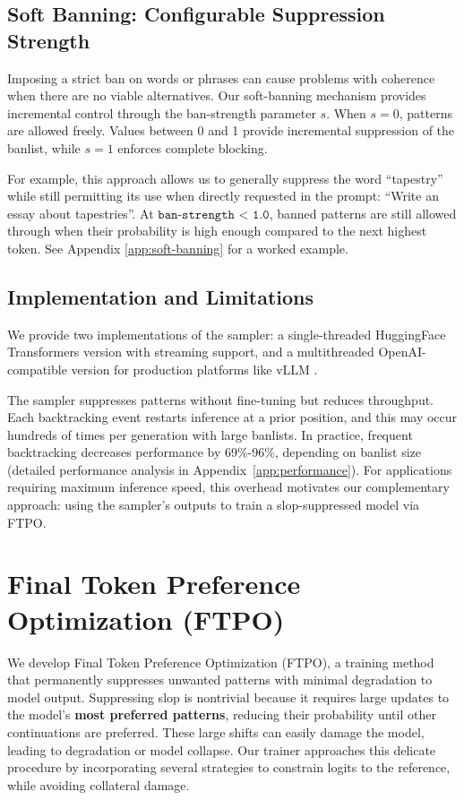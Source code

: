 \documentclass[11pt]{article}
\begin{document}
\subsection{Soft Banning: Configurable Suppression Strength}
\label{sec:soft_ban}
Imposing a strict ban on words or phrases can cause problems with coherence when there are no viable alternatives. Our soft-banning mechanism provides incremental control through the ban-strength parameter $s$. When $s = 0$, patterns are allowed freely. Values between 0 and 1 provide incremental suppression of the banlist, while $s = 1$ enforces complete blocking.

For example, this approach allows us to generally suppress the word ``tapestry'' while still permitting its use when directly requested in the prompt: ``Write an essay about tapestries''. At \(\texttt{ban-strength < 1.0}\), banned patterns are still allowed through when their probability is high enough compared to the next highest token. See Appendix \ref{app:soft-banning} for a worked example.


\subsection{Implementation and Limitations}

We provide two implementations of the sampler: a single-threaded HuggingFace Transformers version with streaming support, and a multithreaded OpenAI-compatible version for production platforms like vLLM \citep{Kwon2023PagedAttention}.

The sampler suppresses patterns without fine-tuning but reduces throughput. Each backtracking event restarts inference at a prior position, and this may occur hundreds of times per generation with large banlists. In practice, frequent backtracking decreases performance by 69\%-96\%, depending on banlist size (detailed performance analysis in Appendix~\ref{app:performance}). For applications requiring maximum inference speed, this overhead motivates our complementary approach: using the sampler's outputs to train a slop-suppressed model via FTPO.

\section{Final Token Preference Optimization (FTPO)}


We develop Final Token Preference Optimization (FTPO), a training method that permanently suppresses unwanted patterns with minimal degradation to model output. Suppressing slop is nontrivial because it requires large updates to the model's \textbf{most preferred patterns}, reducing their probability until other continuations are preferred. These large shifts can easily damage the model, leading to degradation or model collapse. Our trainer approaches this delicate procedure by incorporating several strategies to constrain logits to the reference, while avoiding collateral damage.
\end{document}
